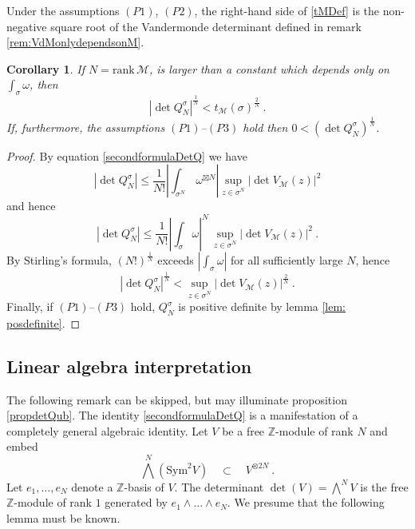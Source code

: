 \documentclass[a4paper,10pt]{amsart}
\newtheorem{cor}[thm]{Corollary}
\theoremstyle{definition}
\theoremstyle{remark}
\numberwithin{equation}{section}
\newcommand{\Z}{\mathbb Z}
\newcommand{\0}{\color{blue}{\mathsf{0}}}
\begin{document}
Under the assumptions $(P1)$, $(P2)$,  the right-hand side of \eqref{tMDef} is    the non-negative square root of the  Vandermonde determinant  defined in remark 
\ref{rem:VdMonlydependsonM}.

\begin{cor} \label{cor: detQNBoundTr}  
If  $N= \mathrm{rank}\, \mathcal{M}$, is larger than a constant which  depends only on $\int_{\sigma} \omega$, then
\begin{equation} \label{detQsigmaUpperBound}    |\det Q^{\sigma}_N|^{\frac{1}{N}}     < t_{\mathcal{M}} (\sigma)^{\frac{2}{N}}  \ .  
\end{equation} 
If, furthermore, the assumptions $(P1)$--$(P3)$ hold then $  0< (\det Q^{\sigma}_N)^{\frac{1}{N}}$. 
\end{cor} 
\begin{proof} By equation \eqref{secondformulaDetQ} we have
\[    \left| \det Q^{\sigma}_N \right|    \leq   \frac{1}{N!} \left| \int_{\sigma^{N}}  \, \omega^{\boxtimes N} \right|   \sup_{z \in   \sigma^{N}}  \left| \det     V_{\mathcal{M}}( z)   \right|^2  \]
and hence 
\[   | \det Q^{\sigma}_N | \leq 
   \frac{1}{N!}  \left| \int_{\sigma} \omega \right|^{N}  \, \sup_{z \in \sigma^{N}}  \left| \det     V_{\mathcal{M}}( z)   \right|^2 \ . \]
     By Stirling's formula, $(N!)^{\frac{1}{N}} $   exceeds $ |\int_{\sigma} \omega | $ for all sufficiently large $N$, hence 
     \[    | \det Q^{\sigma}_N |^{\frac{1}{N}} <  \sup_{z \in  \sigma^{N}}  \left| \det     V_{\mathcal{M}}( z)   \right|^{\frac{2}{N}}  \ .  \]
    Finally, if $(P1)$--$(P3)$ hold,   $Q^{\sigma}_N$ is positive definite by  lemma \ref{lem: posdefinite}.
\end{proof}


\subsection{Linear algebra interpretation}  The following remark can be skipped, but may illuminate proposition \ref{propdetQub}. 
The identity \eqref{secondformulaDetQ} is a manifestation of a  completely general algebraic identity. 
 Let $V$ be a free $\Z$-module of rank  $N$ and embed 
\[\textstyle{\bigwedge^{\!\!N} (\mathrm{Sym}^{2} V) } \quad \subset \quad V^{\otimes 2N}\ . \]
Let $e_1,\ldots, e_N$ denote a $\Z$-basis of $V$.  The determinant $\det(V) = \bigwedge^{\!\!N} V$ is the free  $\Z$-module of rank $1$  generated by 
$e_1\wedge \ldots \wedge e_N$. We presume that the following lemma must be known.
\end{document}
